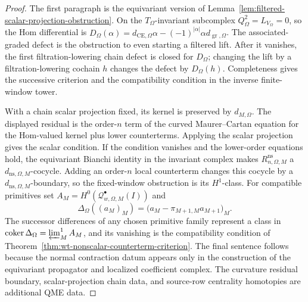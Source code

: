 \begin{proof}
  The first paragraph is the equivariant version of
  Lemma~\ref{lem:filtered-scalar-projection-obstruction}.  On the
  \(T_\Omega\)-invariant subcomplex \(Q_\Omega^2=L_{V_\Omega}=0\), so the
  Hom differential is
  \(D_\Omega(\alpha)=d_{\mathrm{CE},\Omega}\alpha
  -(-1)^{|\alpha|}\alpha d_{\operatorname{gr},\Omega}\).  The
  associated-graded defect is the obstruction to even starting a filtered
  lift.  After it vanishes, the first filtration-lowering chain defect is
  closed for \(D_\Omega\); changing the lift by a filtration-lowering
  cochain \(h\) changes the defect by
  \(D_\Omega(h)\).  Completeness gives the successive criterion and the
  compatibility condition in the inverse finite-window tower.

  With a chain scalar projection fixed, its kernel is preserved by
  \(d_{M,\Omega}\).  The displayed residual is the order-\(n\) term of the
  curved Maurer--Cartan equation for the Hom-valued kernel plus lower
  counterterms.  Applying the scalar projection gives the scalar condition.  If
  the condition vanishes and the lower-order equations hold, the equivariant
  Bianchi identity in the invariant complex makes
  \(R^{\mathrm{ns}}_{n,\Omega,M}\) a
  \(d_{\mathrm{ns},\Omega,M}\)-cocycle.  Adding an order-\(n\) local
  counterterm changes this cocycle by a
  \(d_{\mathrm{ns},\Omega,M}\)-boundary, so the fixed-window obstruction
  is its \(H^1\)-class.  For compatible primitives set
  \(A_M=H^0(\mathcal Q^\bullet_{w,\Omega,M}(I))\) and
  \[
    \Delta_\Omega((a_M)_M)
      =
      \bigl(a_M-\pi_{M+1,M}a_{M+1}\bigr)_M .
  \]
  The successor differences of any chosen primitive family represent a
  class in
  \(\operatorname{coker}\Delta_\Omega
  =\varprojlim\nolimits^1_M A_M\), and its vanishing is the
  compatibility condition of
  Theorem~\ref{thm:wt-nonscalar-counterterm-criterion}.  The final
  sentence follows because the normal contraction datum appears only in
  the construction of the equivariant propagator and localized coefficient
  complex.  The curvature residual boundary, scalar-projection chain data,
  and source-row centrality homotopies are additional QME data.
\end{proof}

